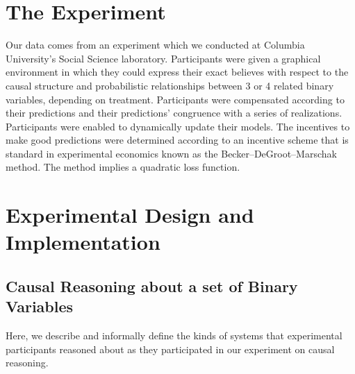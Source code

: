 \section{The Experiment} 

Our data comes from an experiment which we conducted at Columbia University's Social Science laboratory.  Participants were given a graphical environment in which they could express their exact believes with respect to the causal structure and probabilistic relationships between 3 or 4 related binary variables, depending on treatment.  Participants were compensated according to their predictions and their predictions' congruence with a series of realizations.  Participants were enabled to dynamically update their models.   The incentives to make good predictions were determined according to an incentive scheme that is standard in experimental economics known as the Becker–DeGroot–Marschak method.  The method implies a quadratic loss function. 

\section{Experimental Design and Implementation}

\subsection{Causal Reasoning about a set of Binary Variables}

Here, we describe and informally define the kinds of systems that experimental participants reasoned about as they participated in our experiment on causal reasoning. 




